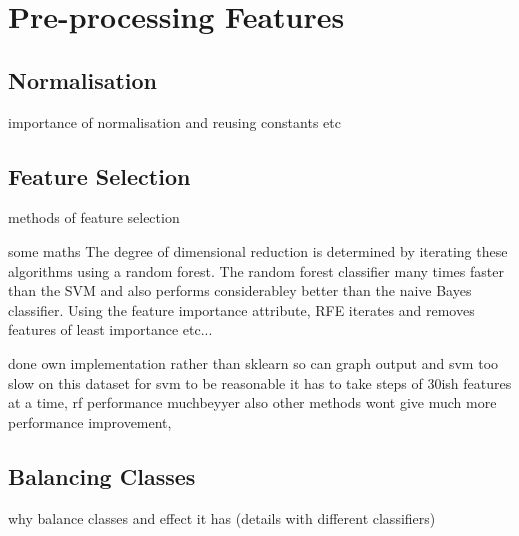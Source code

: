 \section{Pre-processing Features}
\label{sec:pl-featpreproc}

    \subsection{Normalisation}
    \label{subsec:pl-featpreproc-norm}
        \begin{sitemize}
            \item{importance of normalisation and reusing constants etc}
        \end{sitemize}

    \subsection{Feature Selection}
    \label{subsec:pl-featpreproc-sel}
        \begin{sitemize}
            \item{methods of feature selection}
            \item{some maths}
            The degree of dimensional reduction is determined by iterating these algorithms using a random forest. The random forest classifier many times faster than the SVM and also performs considerabley better than the naive Bayes classifier. Using the feature importance attribute, RFE iterates and removes features of least importance etc...
            
            done own implementation rather than sklearn so can graph output and svm too slow on this dataset
            for svm to be reasonable it has to take steps of 30ish features at a time, rf performance muchbeyyer also other methods wont give much more performance improvement, 
        \end{sitemize}
        
    
    \subsection{Balancing Classes}
    \label{subsec:pl-featpreproc-bal}
        \begin{sitemize}
            \item{why balance classes and effect it has (details with different classifiers)}
        \end{sitemize}
    
